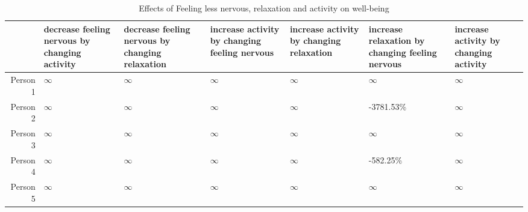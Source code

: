 \begin{table*}[ht]
\centering
\begin{tabular}{rllllll}
  \toprule
 & decrease feeling nervous by changing activity & decrease feeling nervous by changing relaxation & increase activity by changing feeling nervous & increase activity by changing relaxation & increase relaxation by changing feeling nervous  & increase activity by changing activity \\ 
  \midrule
Person 1 & $\infty$ & $\infty$ & $\infty$ & $\infty$ & $\infty$ & $\infty$ \\ 
  Person 2 & $\infty$ & $\infty$ & $\infty$ & $\infty$ & -3781.53\% & $\infty$ \\ 
  Person 3 & $\infty$ & $\infty$ & $\infty$ & $\infty$ & $\infty$ & $\infty$ \\ 
  Person 4 & $\infty$ & $\infty$ & $\infty$ & $\infty$ & -582.25\% & $\infty$ \\ 
  Person 5 & $\infty$ & $\infty$ & $\infty$ & $\infty$ & $\infty$ & $\infty$ \\ 
   \bottomrule
\end{tabular}
\caption{Effects of Feeling less nervous, relaxation and activity on well-being} 
\label{tab:percentage_effects_in_aira}
\end{table*}
